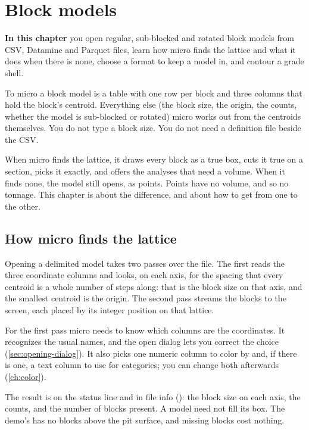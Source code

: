 \chapter{Block models}\label{ch:blocks}
\begin{goals}
\textbf{In this chapter} you open regular, sub-blocked and rotated block models from CSV, Datamine and Parquet files, learn how micro finds the lattice and what it does when there is none, choose a format to keep a model in, and contour a grade shell.
\end{goals}

To micro a block model is a table with one row per block and three columns that hold the block's centroid. Everything else (the block size, the origin, the counts, whether the model is sub-blocked or rotated) micro works out from the centroids themselves. You do not type a block size. You do not need a definition file beside the CSV.

When micro finds the lattice, it draws every block as a true box, cuts it true on a section, picks it exactly, and offers the analyses that need a volume. When it finds none, the model still opens, as points. Points have no volume, and so no tonnage. This chapter is about the difference, and about how to get from one to the other.

\section{How micro finds the lattice}\label{sec:blocks-lattice}

Opening a delimited model takes two passes over the file. The first reads the three coordinate columns and looks, on each axis, for the spacing that every centroid is a whole number of steps along: that is the block size on that axis, and the smallest centroid is the origin. The second pass streams the blocks to the screen, each placed by its integer position on that lattice.

For the first pass micro needs to know which columns are the coordinates. It recognizes the usual names, and the open dialog lets you correct the choice (\cref{sec:opening-dialog}). It also picks one numeric column to color by and, if there is one, a text column to use for categories; you can change both afterwards (\cref{ch:color}).

The result is on the status line and in file info (): the block size on each axis, the counts, and the number of blocks present. A model need not fill its box. The demo's  has no blocks above the pit surface, and missing blocks cost nothing.

